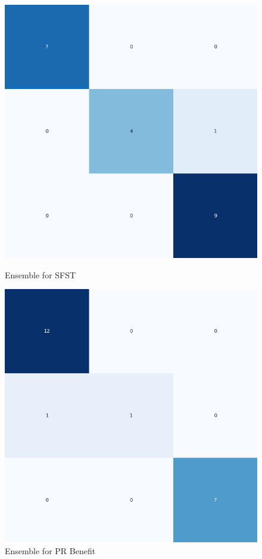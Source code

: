 \begin{figure}[H]
    \centering
    \begin{minipage}[b]{0.45\textwidth}
        \includegraphics[width=\textwidth]{./class_specificxtra_section/ensemble_plots/ensemble_confusion_matrix_SFST.png}
        \caption{Ensemble for SFST}
        \label{fig_class:specxtra_ensemble_sfst}
    \end{minipage}
    \hfill
    \begin{minipage}[b]{0.45\textwidth}
        \includegraphics[width=\textwidth]{./class_specificxtra_section/ensemble_plots/ensemble_confusion_matrix_PR_Benefit.png}
        \caption{Ensemble for PR Benefit}
        \label{fig_class:specxtra_ensemble_pr_benefit}
    \end{minipage}
\end{figure}

